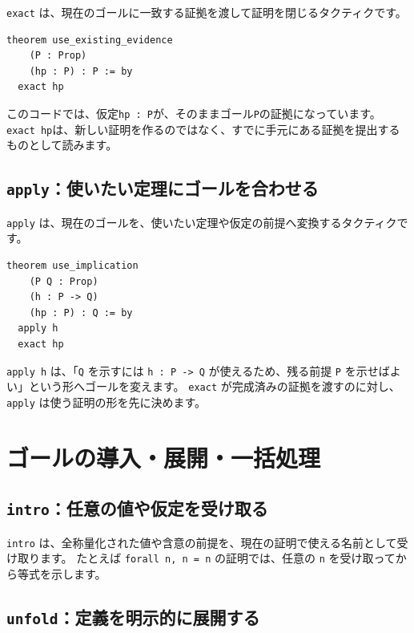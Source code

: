 \texttt{exact} は、現在のゴールに一致する証拠を渡して証明を閉じるタクティクです。

\begin{listing}[htbp]
\begin{verbatim}
theorem use_existing_evidence
    (P : Prop)
    (hp : P) : P := by
  exact hp
\end{verbatim}
\caption{\texttt{use\_existing\_evidence}}
\label{lst:appA_exact}
\end{listing}

このコードでは、仮定\texttt{hp : P}が、そのままゴール\texttt{P}の証拠になっています。
\texttt{exact hp}は、新しい証明を作るのではなく、すでに手元にある証拠を提出するものとして読みます。

\subsection{\texttt{apply}：使いたい定理にゴールを合わせる}

\texttt{apply} は、現在のゴールを、使いたい定理や仮定の前提へ変換するタクティクです。

\begin{listing}[htbp]
\begin{verbatim}
theorem use_implication
    (P Q : Prop)
    (h : P -> Q)
    (hp : P) : Q := by
  apply h
  exact hp
\end{verbatim}
\caption{\texttt{use\_implication}}
\label{lst:appA_apply}
\end{listing}

\texttt{apply h} は、「\texttt{Q} を示すには \texttt{h : P -> Q} が使えるため、残る前提 \texttt{P} を示せばよい」という形へゴールを変えます。
\texttt{exact} が完成済みの証拠を渡すのに対し、\texttt{apply} は使う証明の形を先に決めます。

\section{ゴールの導入・展開・一括処理}

\subsection{\texttt{intro}：任意の値や仮定を受け取る}

\texttt{intro} は、全称量化された値や含意の前提を、現在の証明で使える名前として受け取ります。
たとえば \texttt{forall n, n = n} の証明では、任意の \texttt{n} を受け取ってから等式を示します。

\subsection{\texttt{unfold}：定義を明示的に展開する}

